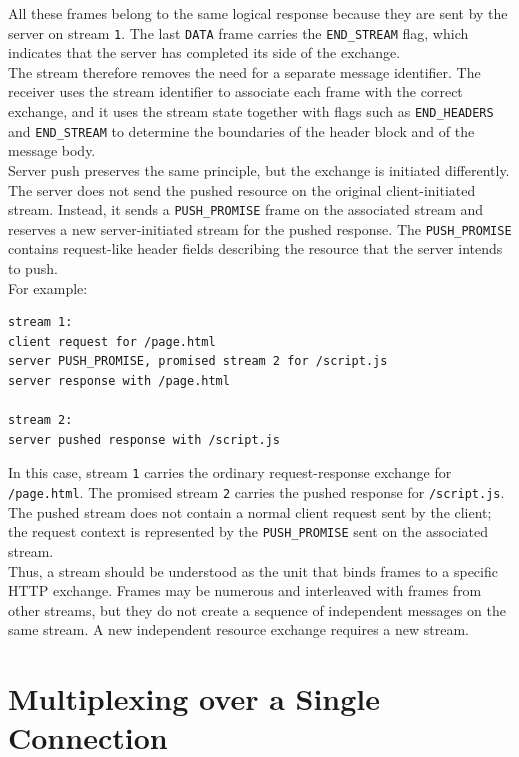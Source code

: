 \documentclass{scrbook}
\begin{document}
All these frames belong to the same logical response because they are sent by the server on stream \texttt{1}. The last \texttt{DATA} frame carries the \texttt{END\_STREAM} flag, which indicates that the server has completed its side of the exchange.\\

The stream therefore removes the need for a separate message identifier. The receiver uses the stream identifier to associate each frame with the correct exchange, and it uses the stream state together with flags such as \texttt{END\_HEADERS} and \texttt{END\_STREAM} to determine the boundaries of the header block and of the message body.\\

Server push preserves the same principle, but the exchange is initiated differently. The server does not send the pushed resource on the original client-initiated stream. Instead, it sends a \texttt{PUSH\_PROMISE} frame on the associated stream and reserves a new server-initiated stream for the pushed response. The \texttt{PUSH\_PROMISE} contains request-like header fields describing the resource that the server intends to push.\\

For example:

\begin{lstlisting}
stream 1:
client request for /page.html
server PUSH_PROMISE, promised stream 2 for /script.js
server response with /page.html

stream 2:
server pushed response with /script.js
\end{lstlisting}

In this case, stream \texttt{1} carries the ordinary request-response exchange for \texttt{/page.html}. The promised stream \texttt{2} carries the pushed response for \texttt{/script.js}. The pushed stream does not contain a normal client request sent by the client; the request context is represented by the \texttt{PUSH\_PROMISE} sent on the associated stream.\\

Thus, a stream should be understood as the unit that binds frames to a specific HTTP exchange. Frames may be numerous and interleaved with frames from other streams, but they do not create a sequence of independent messages on the same stream. A new independent resource exchange requires a new stream.

\section{Multiplexing over a Single Connection}
\end{document}
